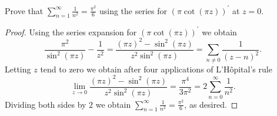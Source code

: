 \documentclass[10pt]{amsart}
\begin{document}
\begin{thm}
  \label{Ex5}
  Prove that ${\displaystyle{\sum_{n=1}^{\infty} \frac{1}{n^2}} = \frac{\pi^2}{6}}$ using the series for $(\pi\cot(\pi z))^{\prime}$ at $z = 0$.
  \begin{proof}
    Using the series expansion for $(\pi\cot(\pi z))^{\prime}$ we obtain
    $$\frac{\pi^2}{\sin^2(\pi z)} - \frac{1}{z^2} = \frac{(\pi z)^2 - \sin^2(\pi z)}{z^2\sin^2(\pi z)} = \sum_{n \neq 0} \frac{1}{(z-n)^2}.$$
    Letting $z$ tend to zero we obtain after four applications of L'H\^opital's rule
    $$\lim_{z\rightarrow 0} \frac{(\pi z)^2 - \sin^2(\pi z)}{z^2\sin^2(\pi z)} = \frac{\pi^4}{3\pi^2} = 2 \sum_{n=0}^{\infty}\frac{1}{n^2}.$$
    Dividing both sides by $2$ we obtain $\displaystyle{\sum_{n=1}^{\infty} \frac{1}{n^2} = \frac{\pi^2}{6}}$, as desired.
  \end{proof}
\end{thm}
\end{document}
